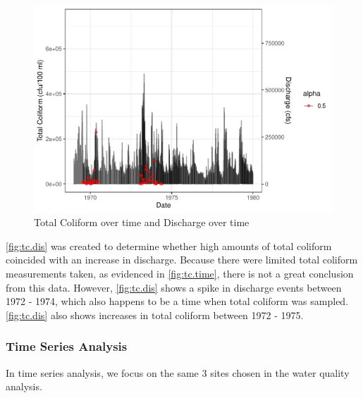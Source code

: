 \documentclass[12pt,]{article}
\begin{document}
\begin{figure}
\centering
\includegraphics{Project_Template_files/figure-latex/tc.dis-1.pdf}
\caption{\label{fig:tc.dis}Total Coliform over time and Discharge over
time}
\end{figure}

\autoref{fig:tc.dis} was created to determine whether high amounts of
total coliform coincided with an increase in discharge. Because there
were limited total coliform measurements taken, as evidenced in
\autoref{fig:tc.time}, there is not a great conclusion from this data.
However, \autoref{fig:tc.dis} shows a spike in discharge events between
1972 - 1974, which also happens to be a time when total coliform was
sampled. \autoref{fig:tc.dis} also shows increases in total coliform
between 1972 - 1975.

\newpage

\hypertarget{time-series-analysis}{%
\subsubsection{Time Series Analysis}\label{time-series-analysis}}

In time series analysis, we focus on the same 3 sites chosen in the
water quality analysis.
\end{document}

